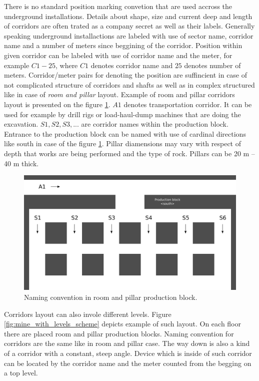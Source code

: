 \documentclass[../main.tex]{subfiles}
\begin{document}
There is no standard position marking convetion that are used accross the underground installations. Details about shape, size and current deep and length of corridors are often trated as a company secret as well as their labels. Generally speaking underground installactions are labeled with use of sector name, corridor name and a number of meters since beggining of the corridor. Position within given corridor can be labeled with use of corridor name and the meter, for example $C1-25$, where $C1$ denotes corridor name and $25$ denotes number of meters. Corridor/meter pairs for denoting the position are suffincient in case of not complicated structure of corridors and shafts as well as in complex structured like in case of \textit{room and pillar} layout. Example of room and pillar corridors layout is presented on the figure \ref{fig:room_and_pillar_scheme}. $A1$ denotes transportation corridor. It can be used for example by drill rigs or load-haul-dump machines that are doing the excavation. $S1, S2, S3, ...$ are corridor names within the production block. Entrance to the production block can be named with use of cardinal directions like south in case of the figure \ref{fig:room_and_pillar_scheme}. Pillar diamensions may vary with respect of depth that works are being performed and the type of rock. Pillars can be 20 m -- 40 m thick.

\begin{figure}[ht]
\includegraphics[width=\textwidth]{pictures/room_and_pillar_scheme.pdf}
\centering
\caption{Naming convention in room and pillar production block.}
\label{fig:room_and_pillar_scheme}
\end{figure}

Corridors layout can also invole different levels. Figure \ref{fig:mine_with_levels_scheme} depicts example of such layout. On each floor there are placed room and pillar production blocks. Naming convention for corridors are the same like in room and pillar case. The way down is also a kind of a corridor with a constant, steep angle. Device which is inside of such corridor can be located by the corridor name and the meter counted from the begging on a top level.
\end{document}
